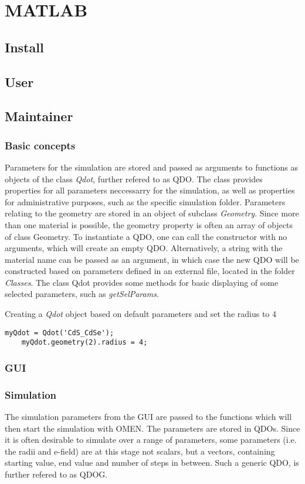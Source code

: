 \chapter{MATLAB}
\section{Install}
\section{User}
\section{Maintainer}
\subsection{Basic concepts}
Parameters for the simulation are stored and passed as arguments to functions as objects of the class \textit{Qdot}, further refered to as QDO. The class provides properties for all parameters neccessarry for the simulation, as well as properties for administrative purposes, such as the specific simulation folder. Parameters relating to the geometry are stored in an object of subclass \textit{Geometry}. Since more than one material is possible, the geometry property is often an array of objects of class Geometry. To instantiate a QDO, one can call the constructor with no arguments, which will create an empty QDO. Alternatively, a string with the material name can be passed as an argument, in which case the new QDO will be constructed based on parameters defined in an external file, located in the folder \textit{Classes}. The class Qdot provides some methods for basic displaying of some selected parameters, such as \textit{getSelParams}.\\

\begin{EXAMPLE}
Creating a \textit{Qdot} object based on default parameters and set the radius to 4
\begin{lstlisting}[frame=none]
	myQdot = Qdot('CdS_CdSe');
	myQdot.geometry(2).radius = 4;\end{lstlisting}
\end{EXAMPLE}
\subsection{GUI}
\subsection{Simulation}
The simulation parameters from the GUI are passed to the functions which will then start the simulation with OMEN. The parameters are stored in QDOs. Since it is often desirable to simulate over a range of parameters, some parameters (i.e. the radii and e-field) are at this stage not scalars, but a vectors, containing starting value, end value and number of steps in between. Such a generic QDO,  is further refered to as QDOG.\\


